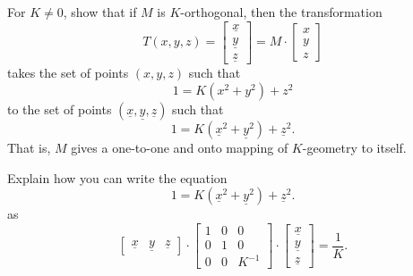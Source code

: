 \documentclass[newpage,hints,handout]{ximera}
\begin{document}
\begin{problem}
  For $K\ne 0$, show that if $M$ is $K$-orthogonal, then the transformation
  \[T(x,y,z)=
  \begin{bmatrix}
    \underline{x} \\ \underline{y} \\ \underline{z}
  \end{bmatrix}
  =M \cdot
  \begin{bmatrix}
    x \\ y \\ z
  \end{bmatrix}
  \]
  takes the set of points $(x,y,z)$ such that
\[
1 = K\left(x^2 + y^2\right) +z^2
\]
to the set of points $(\underline{x},\underline{y},\underline{z})$ such that
\[
1=K\left(\underline{x}^2 + \underline{y}^{2}\right) + \underline{z}^{2}.
\]
That is, $M$ gives a one-to-one and onto mapping of $K$-geometry to
itself.
\begin{hint}
  Explain how you can write the equation
  \[
  1=K\left(\underline{x}^2 + \underline{y}^{2}\right) + \underline{z}^{2}.
  \]
  as
\[
\begin{bmatrix}
\underline{x} & \underline{y} & \underline{z}%
\end{bmatrix}  \cdot\begin{bmatrix}
1 & 0 & 0\\
0 & 1 & 0\\
0 & 0 & K^{-1}%
\end{bmatrix}  \cdot
\begin{bmatrix}
\underline{x}\\
\underline{y}\\
\underline{z}%
\end{bmatrix}  =\frac{1}{K}.
\]
\end{hint}


\end{problem}
\end{document}
